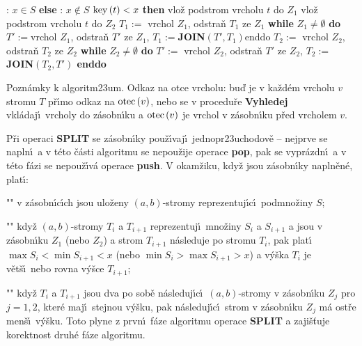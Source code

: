 \phantom{---}{\bf V\'ystup}: $x\in S$\newline 
{\bf else}\newline 
\phantom{---}{\bf V\'ystup}: $x\notin S$\newline 
\phantom{---}{\bf if} $\operatorname{key}\left(t\right)<x$ {\bf then}\newline 
\phantom{------}vlo\v z podstrom vrcholu $t$ do $Z_1$\newline 
\phantom{---}{\bf else}\newline 
\phantom{------}vlo\v z podstrom vrcholu $t$ do $Z_2$\newline 
\phantom{---}{\bf endif\newline 
endif}\newline 
$T_1:=\text{ vrchol }Z_1$, odstra\v n $T_1$ ze $Z_1$\newline 
{\bf while} $Z_1\ne\emptyset$ {\bf do}\newline 
\phantom{---}$T':=$vrchol $Z_1$, odstra\v n $T'$ ze $Z_1$, $T_1:=${\bf JOIN}$\left(T',T_1\right)$\newline enddo\newline 
$T_2:=\text{ vrchol }Z_2$, odstra\v n $T_2$ ze $Z_2$\newline 
{\bf while} $Z_2\ne\emptyset$ {\bf do}\newline 
$T':=\text{ vrchol }Z_2$, odstra\v n $T'$ ze $Z_2$, $T_2:=${\bf JOIN$\left(T_2,T'\right)$\newline 
enddo}
\medskip

\flushpar Pozn\'amky k algoritm\accent23um. \newline 
Odkaz na otce vrcholu: bu\v d je v ka\v zd\'em vrcholu $v$ 
stromu $T$ p\v r\'\i mo odkaz na $\operatorname{otec}\left(v\right)$, nebo se v procedu\v re 
{\bf Vyhledej} vkl\'ada\-j\'\i\ vrcholy do z\'asobn\'\i ku a $\operatorname{otec}
\left(v\right)$ 
je vrchol v z\'asobn\'\i ku p\v red vrcholem $v$.
\smallskip

\flushpar P\v ri operaci {\bf SPLIT} se z\'asobn\'\i ky pou\v z\'\i vaj\'\i\ 
jednopr\accent23uchodov\v e -- nejprve se napln\'\i\ a v t\'eto \v c\'asti 
algoritmu se nepou\v zije operace {\bf pop}, pak se vypr\'azdn\'\i\ a v t\'eto 
f\'azi se nepou\v z\'\i v\'a operace {\bf push}. V okam\v ziku, kdy\v z jsou 
z\'asobn\'\i ky napln\v en\'e, plat\'\i :
\roster
\item"{}"
v z\'asobn\'\i c\'\i ch jsou ulo\v zeny $\left(a,b\right)$-stromy reprezentuj\'\i c\'\i\ 
podmno\v ziny $S$;
\item"{}" 
kdy\v z $\left(a,b\right)$-stromy $T_i$ a $T_{i+1}$ reprezentuj\'\i\ mno\v ziny $S_
i$ a $S_{i+1}$ a jsou v z\'a\-sobn\'\i ku $Z_1$ (nebo $Z_2$) a strom $T_{i+1}$ n\'asleduje 
po stromu $T_{i}$, pak plat\'\i\ $\max S_i<\min S_{i+1}<x$ (nebo 
$\min S_i>\max S_{i+1}>x$) a v\'y\v ska $T_i$ je v\v et\v s\'\i\ nebo 
rovna v\'y\v sce $T_{i+1}$;
\item"{}"
kdy\v z $T_i$ a $T_{i+1}$ jsou dva po sob\v e n\'asleduj\'\i c\'\i\ $
\left(a,b\right)$-stromy v 
z\'asobn\'\i ku $Z_j$ pro $j=1,2$, kter\'e maj\'\i\ stejnou v\'y\v sku, pak 
n\'asleduj\'\i c\'\i\ strom v z\'asobn\'\i ku $Z_j$ m\'a ost\v re men\v s\'\i\ v\'y\v sku.
\endroster
\flushpar Toto plyne z prvn\'\i\ f\'aze algoritmu operace {\bf SPLIT} a zaji\v s\v tuje 
korektnost druh\'e f\'aze algoritmu. 
\medskip

